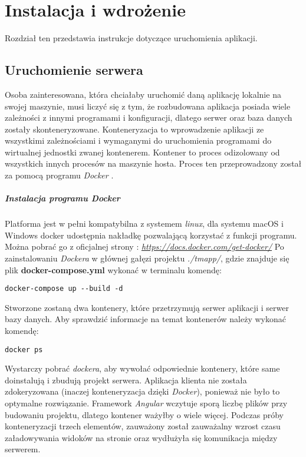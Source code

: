 \chapter{Instalacja i wdrożenie}
\thispagestyle{chapterBeginStyle}
Rozdział ten przedstawia instrukcje dotyczące uruchomienia aplikacji.
\section{Uruchomienie serwera}
 Osoba zainteresowana, która chciałaby uruchomić daną aplikację lokalnie na swojej maszynie, musi liczyć się z tym, że rozbudowana aplikacja posiada wiele zależności z innymi programami i konfiguracji, dlatego serwer oraz baza danych zostały skonteneryzowane.  Konteneryzacja to wprowadzenie aplikacji ze wszystkimi zależnościami i wymaganymi do uruchomienia programami do wirtualnej jednostki zwanej kontenerem. Kontener to proces odizolowany od wszystkich innych procesów na maszynie hosta. Proces ten przeprowadzony został za pomocą programu \textit{Docker} \cite{docker}. 
 \paragraph{Instalacja programu Docker} 
 Platforma jest w pełni kompatybilna z systemem \textit{linux}, dla systemu \linebreak macOS i Windows docker udostępnia nakładkę pozwalającą korzystać z funkcji programu. Można pobrać go z oficjalnej strony :  \textit{\url{https://docs.docker.com/get-docker/}} 
 Po zainstalowaniu \textit{Dockera} w głównej gałęzi projektu \textit{./tmapp/}, gdzie znajduje się plik \textbf{docker-compose.yml}  wykonać w terminalu komendę:
 
 \begin{lstlisting}
docker-compose up --build -d
 \end{lstlisting}


Stworzone zostaną dwa kontenery, które przetrzymują serwer aplikacji i serwer bazy danych. Aby sprawdzić informacje na temat kontenerów należy wykonać komendę:
 
 \begin{lstlisting}
docker ps
\end{lstlisting}

Wystarczy pobrać \textit{dockera}, aby wywołać odpowiednie kontenery, które same doinstalują i zbudują projekt serwera. Aplikacja klienta nie została zdokeryzowana (inaczej konteneryzacja dzięki \textit{Docker}), ponieważ nie było to optymalne rozwiązanie. Framework \textit{Angular} wczytuje sporą liczbę plików przy budowaniu projektu, dlatego kontener ważyłby o wiele więcej. Podczas próby konteneryzacji trzech elementów, zauważony został zauważalny wzrost czasu załadowywania widoków na stronie oraz wydłużyła się komunikacja między serwerem.
\clearpage
